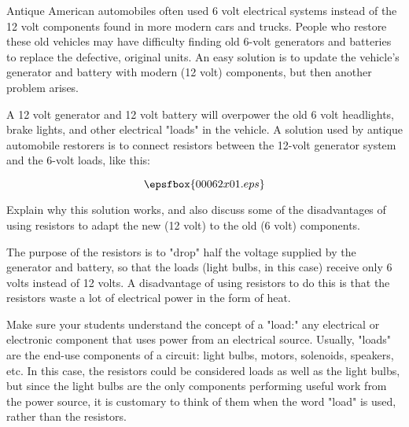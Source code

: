 

Antique American automobiles often used 6 volt electrical systems instead of the 12 volt components found in more modern cars and trucks.  People who restore these old vehicles may have difficulty finding old 6-volt generators and batteries to replace the defective, original units.  An easy solution is to update the vehicle's generator and battery with modern (12 volt) components, but then another problem arises.

A 12 volt generator and 12 volt battery will overpower the old 6 volt headlights, brake lights, and other electrical "loads" in the vehicle.  A solution used by antique automobile restorers is to connect resistors between the 12-volt generator system and the 6-volt loads, like this:

$$\epsfbox{00062x01.eps}$$

Explain why this solution works, and also discuss some of the disadvantages of using resistors to adapt the new (12 volt) to the old (6 volt) components.







The purpose of the resistors is to "drop" half the voltage supplied by the generator and battery, so that the loads (light bulbs, in this case) receive only 6 volts instead of 12 volts.  A disadvantage of using resistors to do this is that the resistors waste a lot of electrical power in the form of heat.







Make sure your students understand the concept of a "load:" any electrical or electronic component that uses power from an electrical source.  Usually, "loads" are the end-use components of a circuit: light bulbs, motors, solenoids, speakers, etc.  In this case, the resistors could be considered loads as well as the light bulbs, but since the light bulbs are the only components performing useful work from the power source, it is customary to think of them when the word "load" is used, rather than the resistors.




